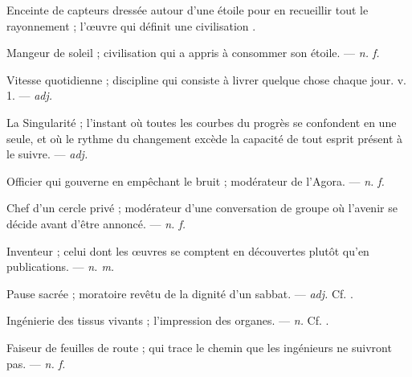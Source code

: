  Enceinte de capteurs dressée autour d'une étoile pour en recueillir tout le rayonnement ; l'œuvre qui définit une civilisation .

 Mangeur de soleil ; civilisation qui a appris à consommer son étoile. ---  \textit{n. f.}

 Vitesse quotidienne ; discipline qui consiste à livrer quelque chose chaque jour.   v. 1. ---  \textit{adj.}

 La Singularité ; l'instant où toutes les courbes du progrès se confondent en une seule, et où le rythme du changement excède la capacité de tout esprit présent à le suivre. ---  \textit{adj.}

 Officier qui gouverne en empêchant le bruit ; modérateur de l'Agora. ---  \textit{n. f.}

 Chef d'un cercle privé ; modérateur d'une conversation de groupe où l'avenir se décide avant d'être annoncé. ---  \textit{n. f.}

 Inventeur ; celui dont les œuvres se comptent en découvertes plutôt qu'en publications. ---  \textit{n. m.}

 Pause sacrée ; moratoire revêtu de la dignité d'un sabbat.   ---  \textit{adj.} Cf. .

 Ingénierie des tissus vivants ; l'impression des organes. ---  \textit{n.} Cf. .

 Faiseur de feuilles de route ; qui trace le chemin que les ingénieurs ne suivront pas.  ---  \textit{n. f.}

